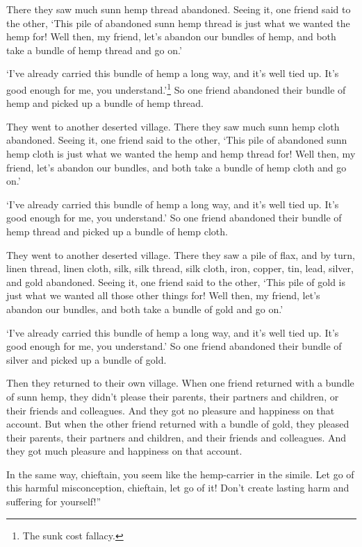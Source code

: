 \documentclass[12pt,openany]{book}%
\begin{document}
There they saw much sunn hemp thread abandoned. Seeing it, one friend said to the other, ‘This pile of abandoned sunn hemp thread is just what we wanted the hemp for! Well then, my friend, let’s abandon our bundles of hemp, and both take a bundle of hemp thread and go on.’ 

‘I’ve already carried this bundle of hemp a long way, and it’s well tied up. It’s good enough for me, you understand.’\footnote{The sunk cost fallacy. } So one friend abandoned their bundle of hemp and picked up a bundle of hemp thread. 

They went to another deserted village. There they saw much sunn hemp cloth abandoned. Seeing it, one friend said to the other, ‘This pile of abandoned sunn hemp cloth is just what we wanted the hemp and hemp thread for! Well then, my friend, let’s abandon our bundles, and both take a bundle of hemp cloth and go on.’ 

‘I’ve already carried this bundle of hemp a long way, and it’s well tied up. It’s good enough for me, you understand.’ So one friend abandoned their bundle of hemp thread and picked up a bundle of hemp cloth. 

They went to another deserted village. There they saw a pile of flax, and by turn, linen thread, linen cloth, silk, silk thread, silk cloth, iron, copper, tin, lead, silver, and gold abandoned. Seeing it, one friend said to the other, ‘This pile of gold is just what we wanted all those other things for! Well then, my friend, let’s abandon our bundles, and both take a bundle of gold and go on.’ 

‘I’ve already carried this bundle of hemp a long way, and it’s well tied up. It’s good enough for me, you understand.’ So one friend abandoned their bundle of silver and picked up a bundle of gold. 

Then they returned to their own village. When one friend returned with a bundle of sunn hemp, they didn’t please their parents, their partners and children, or their friends and colleagues. And they got no pleasure and happiness on that account. But when the other friend returned with a bundle of gold, they pleased their parents, their partners and children, and their friends and colleagues. And they got much pleasure and happiness on that account. 

In the same way, chieftain, you seem like the hemp-carrier in the simile. Let go of this harmful misconception, chieftain, let go of it! Don’t create lasting harm and suffering for yourself!” 
\end{document}
